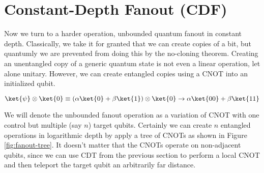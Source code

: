 \documentclass{article}
\begin{document}
\section{Constant-Depth Fanout (\textsc{CDF})}

Now we turn to a harder operation, unbounded quantum fanout in constant depth.
Classically, we take it for granted that we can create copies of a bit,
but quantumly we are prevented from doing this by the no-cloning theorem.
Creating an unentangled copy of a generic quantum state is not even a linear
operation, let alone unitary. However, we can create entangled copies using
a CNOT into an initialized qubit.

\begin{equation}
\ket{\psi} \otimes \ket{0} \equiv
(\alpha\ket{0} + \beta\ket{1}) \otimes \ket{0} \rightarrow
\alpha\ket{00} + \beta\ket{11}
\end{equation}

We will denote the unbounded fanout operation as a variation of CNOT with
one control but multiple (say $n$) target qubits. Certainly we can create
$n$ entangled operations in logarithmic depth by apply a tree of CNOTs
as shown in Figure \ref{fig:fanout-tree}. It doesn't matter that the CNOTs
operate on non-adjacent qubits, since we can use CDT from the previous
section to perform a local CNOT and then teleport the target qubit an
arbitrarily far distance.
\end{document}
